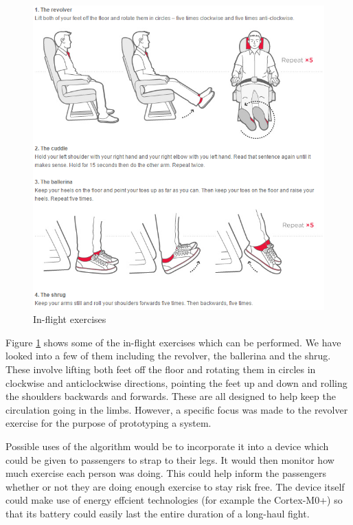 \begin{figure}[h]
  \centering
    \includegraphics[width=1.0\textwidth]{figures/exercises}
  \caption{In-flight exercises \cite{virgin2015exercises}}
  \label{fig:exercises}
\end{figure}

Figure \ref{fig:exercises} shows some of the in-ﬂight exercises which can be performed. We have looked into a few of them including the revolver, the ballerina and the shrug. These involve lifting both feet oﬀ the ﬂoor and rotating them in circles in clockwise and anticlockwise directions, pointing the feet up and down and rolling the shoulders backwards and forwards. These are all designed to help keep the circulation going in the limbs. However, a speciﬁc focus was made to the revolver exercise for the purpose of prototyping a system.

Possible uses of the algorithm would be to incorporate it into a device which could be given to passengers to strap to their legs. It would then monitor how much exercise each person was doing. This could help inform the passengers whether or not they are doing enough exercise to stay risk free. The device itself could make use of energy effcient technologies (for example the Cortex-M0+) so that its battery could easily last the entire duration of a long-haul fight.

